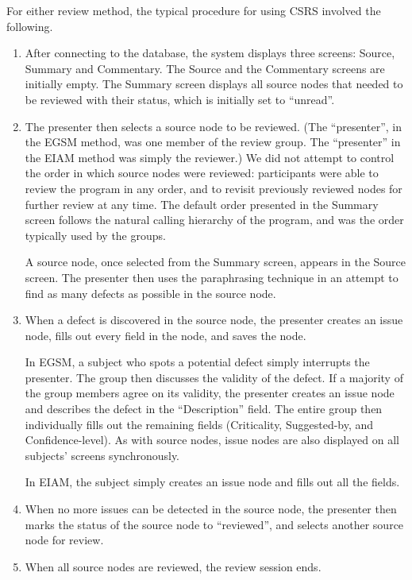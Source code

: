 For either review method, the typical procedure for using CSRS 
involved the following.

\begin{enumerate}
  
\item After connecting to the database, the system displays three screens:
  Source, Summary and Commentary.  The Source and the Commentary screens
  are initially empty.  The Summary screen displays all source nodes that
  needed to be reviewed with their status, which is initially set to
  ``unread''.
  
\item The presenter then selects a source node to be reviewed. (The
  ``presenter'', in the EGSM method, was one member of the review group.
  The ``presenter'' in the EIAM method was simply the reviewer.)  We did
  not attempt to control the order in which source nodes were reviewed:
  participants were able to review the program in any order, and to revisit
  previously reviewed nodes for further review at any time.  The default
  order presented in the Summary screen follows the natural calling
  hierarchy of the program, and was the order typically used by the groups.

  
  A source node, once selected from the Summary screen, appears in the
  Source screen. The presenter then uses the paraphrasing technique in an
  attempt to find as many defects as possible in the source node.
  
  
\item When a defect is discovered in the source node, the presenter creates
  an issue node, fills out every field in the node, and saves the node.
  
  In EGSM, a subject who spots a potential defect simply interrupts the
  presenter. The group then discusses the validity of the defect.  If a
  majority of the group members agree on its validity, the presenter
  creates an issue node and describes the defect in the ``Description''
  field. The entire group then individually fills out the remaining fields
  (Criticality, Suggested-by, and Confidence-level).  As with source nodes,
  issue nodes are also displayed on all subjects' screens synchronously.

  In EIAM, the subject simply creates an issue node and fills out all the fields.
  
\item When no more issues can be detected in the source node, the presenter
  then marks the status of the source node to ``reviewed'', and selects
  another source node for review.

\item When all source nodes are reviewed, the review session ends. 

\end{enumerate}



